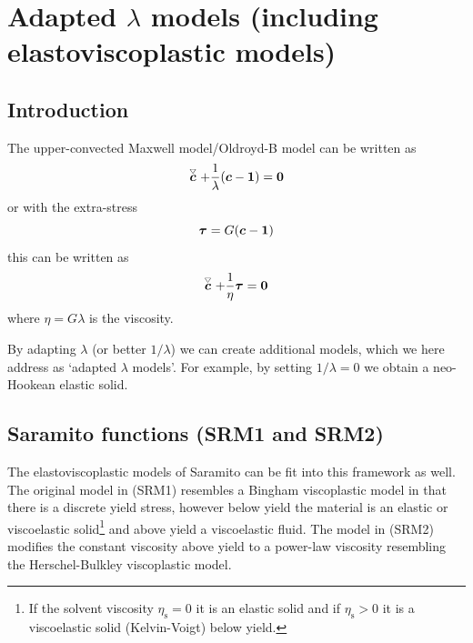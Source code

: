 \section{Adapted $\lambda$ models (including elastoviscoplastic models)}
\label{sec:alammodels}
\subsection{Introduction}
The upper-convected Maxwell model/Oldroyd-B model can be written as
\begin{equation}
   \stackrel{\scriptscriptstyle\bigtriangledown}{\boldsymbol{c}}+\dfrac1\lambda(\boldsymbol{c}-\boldsymbol{1})=\boldsymbol{0} \label{eq:clambdamodel}
\end{equation}
or with the extra-stress
\[
     \boldsymbol{\tau}=G(\boldsymbol{c} - \boldsymbol{1})
\]
this can be written as
\begin{equation}
   \stackrel{\scriptscriptstyle\bigtriangledown}{\boldsymbol{c}}+\dfrac1{\eta}\boldsymbol{\tau}=\boldsymbol{0} \label{eq:etamodel}
\end{equation}
where $\eta=G\lambda$ is the viscosity. 

By adapting $\lambda$ (or better $1/\lambda$) we can create additional models, which we here address as `adapted $\lambda$ models'. For example, by setting $1/\lambda=0$ 
 we obtain a neo-Hookean elastic solid. 

\subsection{Saramito functions (SRM1 and SRM2)}
The elastoviscoplastic models of Saramito \cite{saramito_new_2007,saramito_new_2009,saramito_complex_2016} can be fit into this framework as well. The original model in \cite{saramito_new_2007} (SRM1) resembles a Bingham viscoplastic model in that there is a discrete yield stress, however below yield the material is an elastic or viscoelastic solid\footnote{If the solvent viscosity $\eta_\text{s}=0$ it is an elastic solid and if $\eta_\text{s}>0$ it is a viscoelastic solid (Kelvin-Voigt) below yield.} and above yield a viscoelastic fluid. The model in \cite{saramito_new_2009} (SRM2) modifies the constant viscosity above yield to a power-law viscosity resembling the Herschel-Bulkley viscoplastic model.

